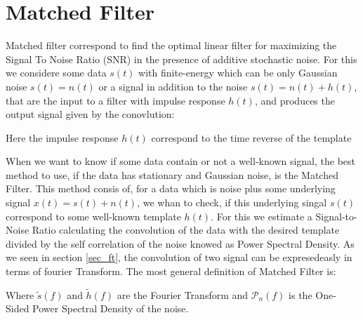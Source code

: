 


\section{Matched Filter}
\newp Matched filter correspond to find the optimal linear filter for maximizing the Signal To Noise Ratio (SNR) in the presence of additive stochastic noise. For this we considere some data $s(t)$ with finite-energy which can be only Gaussian noise $s(t) = n(t)$ or a signal in addition to the noise $s(t) = n(t) + h(t)$, that are the input to a filter with impulse response $h(t)$, and produces the output signal given by the conovlution:


\newp Here the impulse response $h(t)$ correspond to the time reverse of the template

\newp When we want to know if some data contain or not a well-known signal, the best method to use, if the data has stationary and Gaussian noise, is the Matched Filter. This method consis of, for a data which is noise plus some underlying signal $x(t) = s(t) + n(t)$, we whan to check, if this underlying singal $s(t)$ correspond to some well-known template $h(t)$. For this we estimate a Signal-to-Noise Ratio calculating the convolution of the data with the desired template divided by the self correlation of the noise knowed as Power Spectral Density. As we seen in section \ref{sec_ft}, the convolution of two signal can be expresedeasly in terms of fourier Transform. The most general definition of Matched Filter is:


\newp Where $\tilde{s}(f)$ and $\tilde{h}(f)$ are the Fourier Transform and $\mathcal{P}_n(f)$ is the One-Sided Power Spectral Density of the noise.

